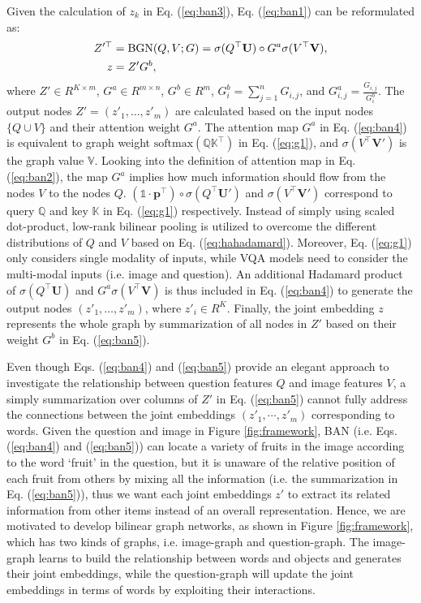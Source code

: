 \documentclass[10pt,twocolumn,letterpaper]{article}
\begin{document}
Given the calculation of $z_k$ in Eq. (\ref{eq:ban3}), Eq. (\ref{eq:ban1}) can be reformulated as:
\vspace{-5pt}
\begin{align} \label{eq:ban4}
Z'^\top &= \mathrm{BGN}(Q, V; G) = \sigma(Q^\top \mathbf{U}) \circ G^a \sigma(V^\top \mathbf{V}), \\ \label{eq:ban5}
z &= Z' G^b,
\vspace{-5pt}
\end{align}
where $Z' \in R^{K \times m}$, $G^a \in R^{m \times n}$, $G^b \in R^m$, $G^b_i=\sum_{j=1}^{n}G_{i,j}$, and $G^a_{i,j} = \frac{G_{i,j}}{G^b_i}$. The output nodes $Z'=(z'_1, \dots, z'_m)$ are calculated based on the input nodes $\{Q \cup V\}$ and their attention weight $G^a$. The attention map $G^a$ in Eq. (\ref{eq:ban4}) is equivalent to graph weight $\text{softmax}(\mathbb{Q} \mathbb{K}^\top)$ in Eq. (\ref{eq:g1}), and $\sigma(V^\top\mathbf{V'})$ is the graph value $\mathbb{V}$. Looking into the definition of attention map in Eq. (\ref{eq:ban2}), the map $G^a$ implies how much information should flow from the nodes $V$ to the nodes $Q$. $(\mathds{1} \cdot \mathbf{p}^\top) \circ \sigma(Q^\top \mathbf{U'})$ and $\sigma(V^\top \mathbf{V'})$ correspond to query $\mathbb{Q}$ and key $\mathbb{K}$ in Eq. (\ref{eq:g1}) respectively. Instead of simply using scaled dot-product, low-rank bilinear pooling is utilized to overcome the different distributions of $Q$ and $V$ based on Eq. (\ref{eq:hahadamard}). Moreover, Eq. (\ref{eq:g1}) only considers single modality of inputs, while VQA models need to consider the multi-modal inputs (i.e. image and question). An additional Hadamard product of $\sigma(Q^\top \mathbf{U})$ and $G^a \sigma(V^\top \mathbf{V})$ is thus included in Eq. (\ref{eq:ban4}) to generate the output nodes $(z'_1, \dots, z'_m)$, where $z'_i \in R^K$. Finally, the joint embedding $z$ represents the whole graph by summarization of all nodes in $Z'$ based on their weight $G^b$ in Eq. (\ref{eq:ban5}). 

Even though Eqs. (\ref{eq:ban4}) and (\ref{eq:ban5}) provide an elegant approach to investigate the relationship between question features $Q$ and image features $V$, a simply summarization over columns of $Z'$ in Eq. (\ref{eq:ban5}) cannot fully address the connections between the joint embeddings $(z'_1, \cdots, z'_m)$ corresponding to words. Given the question and image in Figure \ref{fig:framework}, BAN (i.e. Eqs. (\ref{eq:ban4}) and (\ref{eq:ban5})) can locate a variety of fruits in the image according to the word `fruit' in the question, but it is unaware of the relative position of each fruit from others by mixing all the information (i.e. the summarization in Eq. (\ref{eq:ban5})), thus we want each joint embeddings $z'$ to extract its related information from other items instead of an overall representation. Hence, we are motivated to develop bilinear graph networks, as shown in Figure \ref{fig:framework}, which has two kinds of graphs, i.e. image-graph and question-graph. The image-graph learns to build the relationship between words and objects and generates their joint embeddings, while the question-graph will update the joint embeddings in terms of words by exploiting their interactions. 
\end{document}
